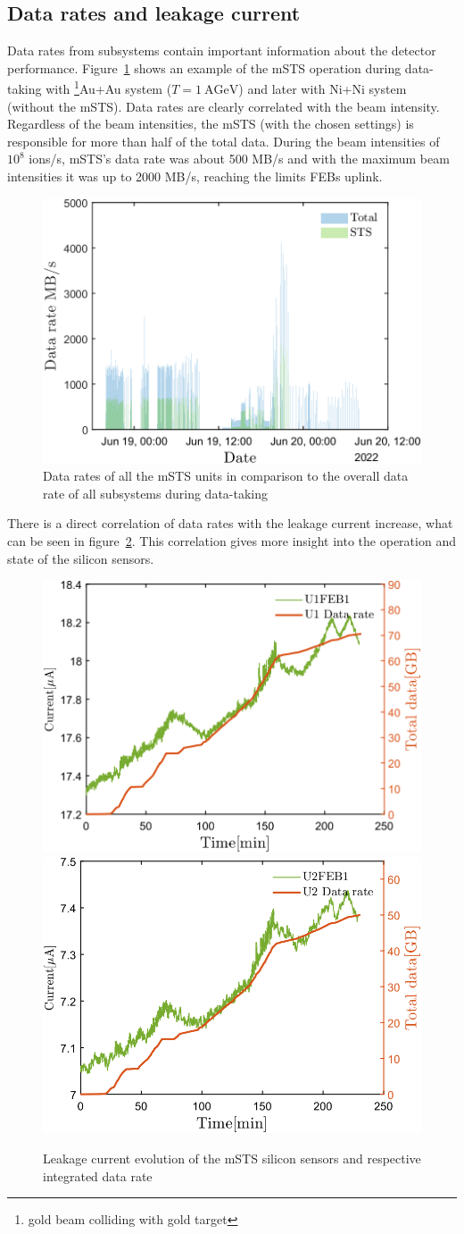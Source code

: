 \subsection{Data rates and leakage current}
Data rates from subsystems contain important information about the detector performance. Figure~\ref{fig_data_rates_Ag} shows an example of the \gls{mSTS} operation during data-taking with \footnote{gold beam colliding with gold target}{Au+Au} system ($T= 1~\mathrm{AGeV}$) and later with Ni+Ni system (without the \gls{mSTS}). Data rates are clearly correlated with the beam intensity. Regardless of the beam intensities, the \gls{mSTS} (with the chosen settings) is responsible for more than half of the total data. During the beam intensities of $10^{8}$ ions/s, \gls{mSTS}'s data rate was about 500 MB/s and with the maximum beam intensities it was up to 2000 MB/s, reaching the limits \gls{FEB}s uplink. 
\begin{figure}[H]
\centering
\includegraphics[width=0.55\columnwidth]{Chapter5/DCS/images/rates/Ag_total.png}
\caption{Data rates of all the \gls{mSTS} units in comparison to the overall data rate of all subsystems during data-taking}
\label{fig_data_rates_Ag}
\end{figure}
\newpage
There is a direct correlation of data rates with the leakage current increase, what can be seen in figure~\ref{fig_Data}. This correlation gives more insight into the operation and state of the silicon sensors.
\begin{figure}[!h]
\centering
\includegraphics[width=0.45\columnwidth]{Chapter5/DCS/images/U1_data_rate.png}
\includegraphics[width=0.45\columnwidth]{Chapter5/DCS/images/U2_data_rate.png}
\caption{Leakage current evolution of the \gls{mSTS} silicon sensors and respective integrated data rate}
\label{fig_Data}
\end{figure}

